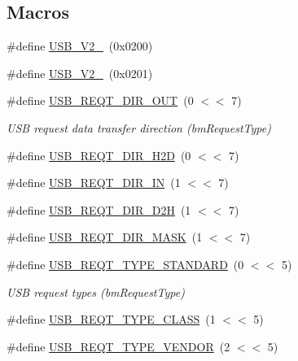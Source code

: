 \subsection*{Macros}
\begin{DoxyCompactItemize}
\item 
\#define \hyperlink{group__usb__protocol__group_ga9bccec980a4f41a481b389b4f0c9c690}{U\+S\+B\+\_\+\+V2\+\_}~(0x0200)
\item 
\#define \hyperlink{group__usb__protocol__group_ga98059f51cd65930412083d423a70dd17}{U\+S\+B\+\_\+\+V2\+\_}~(0x0201)
\item 
\#define \hyperlink{group__usb__protocol__group_ga1656be31dc028f425bdf0038dcd1adc2}{U\+S\+B\+\_\+\+R\+E\+Q\+T\+\_\+\+D\+I\+R\+\_\+\+O\+UT}~(0 $<$$<$ 7)
\begin{DoxyCompactList}\small\item\em U\+SB request data transfer direction (bm\+Request\+Type) \end{DoxyCompactList}\item 
\#define \hyperlink{group__usb__protocol__group_ga928978defeac3ea92d4e06d5c9b23cfe}{U\+S\+B\+\_\+\+R\+E\+Q\+T\+\_\+\+D\+I\+R\+\_\+\+H2D}~(0 $<$$<$ 7)
\item 
\#define \hyperlink{group__usb__protocol__group_ga99708f101cf9acb0ae766810519d7b94}{U\+S\+B\+\_\+\+R\+E\+Q\+T\+\_\+\+D\+I\+R\+\_\+\+IN}~(1 $<$$<$ 7)
\item 
\#define \hyperlink{group__usb__protocol__group_ga02a0c7d30f1a625db822e3a43f628a7b}{U\+S\+B\+\_\+\+R\+E\+Q\+T\+\_\+\+D\+I\+R\+\_\+\+D2H}~(1 $<$$<$ 7)
\item 
\#define \hyperlink{group__usb__protocol__group_gad7e77b7a5960edbe83c1cbdab87db27b}{U\+S\+B\+\_\+\+R\+E\+Q\+T\+\_\+\+D\+I\+R\+\_\+\+M\+A\+SK}~(1 $<$$<$ 7)
\item 
\#define \hyperlink{group__usb__protocol__group_ga17829b4438f99fdd735469d3341aa55b}{U\+S\+B\+\_\+\+R\+E\+Q\+T\+\_\+\+T\+Y\+P\+E\+\_\+\+S\+T\+A\+N\+D\+A\+RD}~(0 $<$$<$ 5)
\begin{DoxyCompactList}\small\item\em U\+SB request types (bm\+Request\+Type) \end{DoxyCompactList}\item 
\#define \hyperlink{group__usb__protocol__group_gaec1398f8c4022154c4f4d1d84d29e140}{U\+S\+B\+\_\+\+R\+E\+Q\+T\+\_\+\+T\+Y\+P\+E\+\_\+\+C\+L\+A\+SS}~(1 $<$$<$ 5)
\item 
\#define \hyperlink{group__usb__protocol__group_ga0b0929d731582b97004a162b1bac58e0}{U\+S\+B\+\_\+\+R\+E\+Q\+T\+\_\+\+T\+Y\+P\+E\+\_\+\+V\+E\+N\+D\+OR}~(2 $<$$<$ 5)

\end{DoxyCompactItemize}
